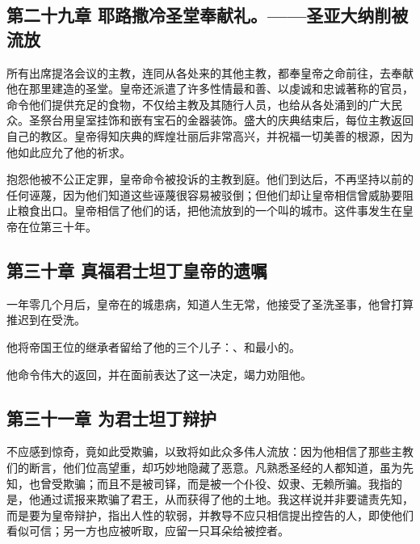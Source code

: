 \subsection{第二十九章 耶路撒冷圣堂奉献礼。——圣亚大纳削被流放}

所有出席提洛会议的主教，连同从各处来的其他主教，都奉皇帝之命前往，去奉献他在那里建造的圣堂。皇帝还派遣了许多性情最和善、以虔诚和忠诚著称的官员，命令他们提供充足的食物，不仅给主教及其随行人员，也给从各处涌到的广大民众。圣祭台用皇室挂饰和嵌有宝石的金器装饰。盛大的庆典结束后，每位主教返回自己的教区。皇帝得知庆典的辉煌壮丽后非常高兴，并祝福一切美善的根源，因为他如此应允了他的祈求。\par

抱怨他被不公正定罪，皇帝命令被投诉的主教到庭。他们到达后，不再坚持以前的任何诬蔑，因为他们知道这些诬蔑很容易被驳倒；但他们却让皇帝相信曾威胁要阻止粮食出口。皇帝相信了他们的话，把他流放到的一个叫的城市。这件事发生在皇帝在位第三十年。\par


\subsection{第三十章 真福君士坦丁皇帝的遗嘱}

一年零几个月后，皇帝在的城患病，知道人生无常，他接受了圣洗圣事，他曾打算推迟到在受洗。\par

他将帝国王位的继承者留给了他的三个儿子：、和最小的。\par

他命令伟大的返回，并在面前表达了这一决定，竭力劝阻他。\par


\subsection{第三十一章 为君士坦丁辩护}

不应感到惊奇，竟如此受欺骗，以致将如此众多伟人流放：因为他相信了那些主教们的断言，他们位高望重，却巧妙地隐藏了恶意。凡熟悉圣经的人都知道，虽为先知，也曾受欺骗；而且不是被司铎，而是被一个仆役、奴隶、无赖所骗。我指的是，他通过谎报来欺骗了君王，从而获得了他的土地。我这样说并非要谴责先知，而是要为皇帝辩护，指出人性的软弱，并教导不应只相信提出控告的人，即使他们看似可信；另一方也应被听取，应留一只耳朵给被控者。\par

